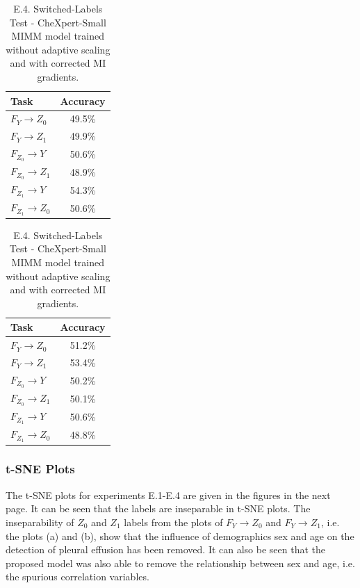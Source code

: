 \documentclass[12pt,DIV14,BCOR12mm,a4paper,footinclude=false,headinclude,parskip=half-,twoside,openright,cleardoublepage=empty,toc=index,bibliography=totoc,listof=totoc]{scrreprt}
\numberwithin{equation}{chapter}
\begin{document}
\begin{table}[H]
\centering
\begin{minipage}{.45\linewidth}
\centering
\begin{tabular}{|l|c|}
\hline
\textbf{Task} & \textbf{Accuracy} \\
\hline
$F_Y \rightarrow Z_0$ & 49.5\% \\
$F_Y \rightarrow Z_1$ & 49.9\% \\
\hline
$F_{Z_0} \rightarrow Y$ & 50.6\% \\
$F_{Z_0} \rightarrow Z_1$ & 48.9\% \\
\hline
$F_{Z_1} \rightarrow Y$ & 54.3\% \\
$F_{Z_1} \rightarrow Z_0$ & 50.6\% \\
\hline
\end{tabular}
\caption{E.3. Switched-Labels Test - CheXpert-Small MIMM model trained with adaptive scaling and without corrected MI gradients.}
\label{tab:accuracy_tasks-chxMIMM_ada_nocorr}
\end{minipage}%
\hfill
\begin{minipage}{.45\linewidth}
\centering
\begin{tabular}{|l|c|}
\hline
\textbf{Task} & \textbf{Accuracy} \\
\hline
$F_Y \rightarrow Z_0$ & 51.2\% \\
$F_Y \rightarrow Z_1$ & 53.4\% \\
\hline
$F_{Z_0} \rightarrow Y$ & 50.2\% \\
$F_{Z_0} \rightarrow Z_1$ & 50.1\% \\
\hline
$F_{Z_1} \rightarrow Y$ & 50.6\% \\
$F_{Z_1} \rightarrow Z_0$ & 48.8\% \\
\hline
\end{tabular}
\caption{E.4. Switched-Labels Test - CheXpert-Small MIMM model trained without adaptive scaling and with corrected MI gradients.}
\label{tab:accuracy_tasks-chxMIMM_noada_corr}
\end{minipage}%
\end{table}


\subsubsection{t-SNE Plots}
The t-SNE plots for experiments E.1-E.4 are given in the figures in the next page. It can be seen that the labels are inseparable in t-SNE plots. The inseparability of $Z_0$ and $Z_1$ labels from the plots of $F_{Y} \rightarrow Z_0$ and $F_{Y} \rightarrow Z_1$, i.e. the plots (a) and (b), show that the influence of demographics sex and age on the detection of pleural effusion has been removed. It can also be seen that the proposed model was also able to remove the relationship between sex and age, i.e. the spurious correlation variables. 
\end{document}
